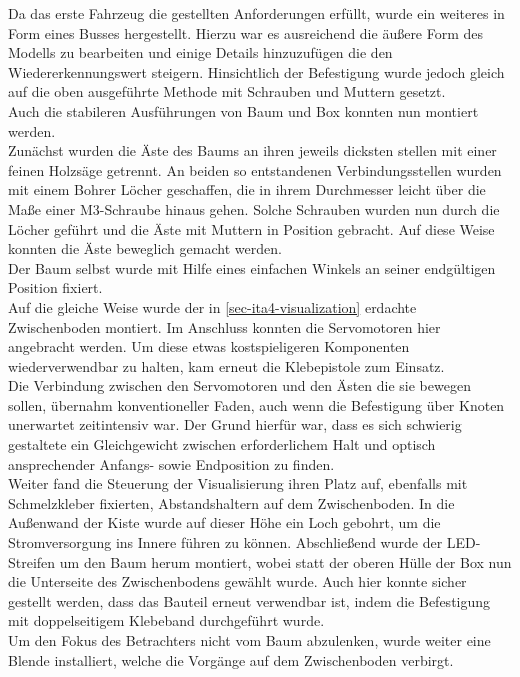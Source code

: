 \documentclass[.../Dokumentation.tex]{subfiles}
\begin{document}
\noindent 
Da das erste Fahrzeug die gestellten Anforderungen erfüllt, wurde ein weiteres 
in Form eines Busses hergestellt. Hierzu war es ausreichend die äußere Form 
des Modells zu bearbeiten und einige Details hinzuzufügen die den 
Wiedererkennungswert steigern. Hinsichtlich der Befestigung wurde jedoch 
gleich auf die oben ausgeführte Methode mit Schrauben und Muttern gesetzt.\\
Auch die stabileren Ausführungen von Baum und Box konnten nun montiert werden.\\
Zunächst wurden die Äste des Baums an ihren jeweils dicksten stellen mit einer 
feinen Holzsäge getrennt. An beiden so entstandenen Verbindungsstellen wurden 
mit einem Bohrer Löcher geschaffen, die in ihrem Durchmesser leicht über die 
Maße einer M3-Schraube hinaus gehen. Solche Schrauben wurden nun durch die 
Löcher geführt und die Äste mit Muttern in Position gebracht. 
Auf diese Weise konnten die Äste beweglich gemacht werden. \\
Der Baum selbst wurde mit Hilfe eines einfachen Winkels an seiner endgültigen 
Position fixiert.\\
Auf die gleiche Weise wurde der in \ref{sec-ita4-visualization} erdachte 
Zwischenboden montiert. Im Anschluss konnten die Servomotoren hier angebracht 
werden. Um diese etwas kostspieligeren Komponenten wiederverwendbar zu halten, 
kam erneut die Klebepistole zum Einsatz.\\
Die Verbindung zwischen den Servomotoren und den Ästen die sie bewegen sollen, 
übernahm konventioneller Faden, auch wenn die Befestigung über Knoten 
unerwartet zeitintensiv war. Der Grund hierfür war, dass es sich schwierig 
gestaltete ein Gleichgewicht zwischen erforderlichem Halt und  
optisch ansprechender Anfangs- sowie Endposition zu finden.\\
Weiter fand die Steuerung der Visualisierung ihren Platz auf, ebenfalls mit 
Schmelzkleber fixierten, Abstandshaltern auf dem Zwischenboden.
In die Außenwand der Kiste wurde auf dieser Höhe ein Loch gebohrt, um die 
Stromversorgung ins Innere führen zu können. 
Abschließend wurde der LED-Streifen um den Baum herum montiert, wobei statt der 
oberen Hülle der Box nun die Unterseite des Zwischenbodens gewählt wurde. 
Auch hier konnte sicher gestellt werden, dass das Bauteil erneut verwendbar 
ist, indem die Befestigung mit doppelseitigem Klebeband durchgeführt wurde.\\
Um den Fokus des Betrachters nicht vom Baum abzulenken, wurde weiter eine 
Blende installiert, welche die Vorgänge auf dem Zwischenboden verbirgt.
\end{document}
